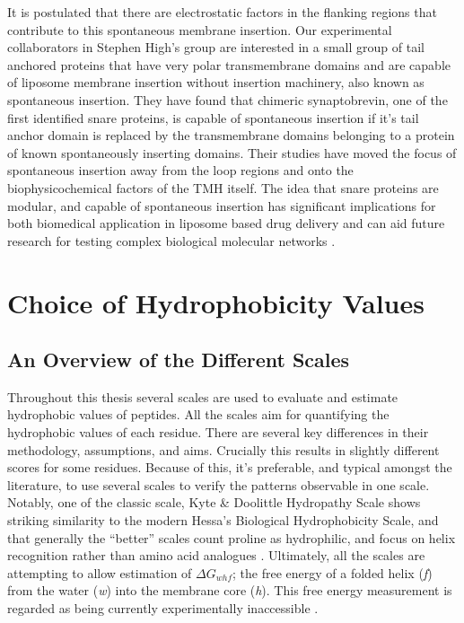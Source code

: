 It is postulated that there are electrostatic factors in the flanking regions that contribute to this spontaneous membrane insertion. Our experimental collaborators in Stephen High’s group are interested in a small group of tail anchored proteins that have very polar transmembrane domains and are capable of liposome membrane insertion without insertion machinery, also known as spontaneous insertion. They have found that chimeric synaptobrevin, one of the first identified \gls{snare} proteins, is capable of spontaneous insertion if it’s tail anchor domain is replaced by the transmembrane domains belonging to a protein of known spontaneously inserting domains. Their studies have moved the focus of spontaneous insertion away from the loop regions and onto the biophysicochemical factors of the TMH itself. The idea that \gls{snare} proteins are modular, and capable of spontaneous insertion has significant implications for both biomedical application in liposome based drug delivery and can aid future research for testing complex biological molecular networks \cite{Allen2013, Nordlund2014}.

\section{Choice of Hydrophobicity Values}
\subsection{An Overview of the Different Scales}
Throughout this thesis several scales are used to evaluate and estimate hydrophobic values of peptides. All the scales aim for quantifying the hydrophobic values of each residue. There are several key differences in their methodology, assumptions, and aims. Crucially this results in slightly different scores for some residues. Because of this, it's preferable, and typical amongst the literature, to use several scales to verify the patterns observable in one scale. Notably, one of the classic scale, Kyte \& Doolittle Hydropathy Scale shows striking similarity to the modern Hessa's Biological Hydrophobicity Scale, and that generally the ``better'' scales count proline as hydrophilic, and focus on helix recognition rather than amino acid analogues \cite{Peters2014}. Ultimately, all the scales are attempting to allow estimation of ${\Delta G}_{whf}$; the free energy of a folded helix ({\it f}) from the water ({\it w}) into the membrane core ({\it h}). This free energy measurement is regarded as being currently experimentally inaccessible \cite{Cymer2014}.

